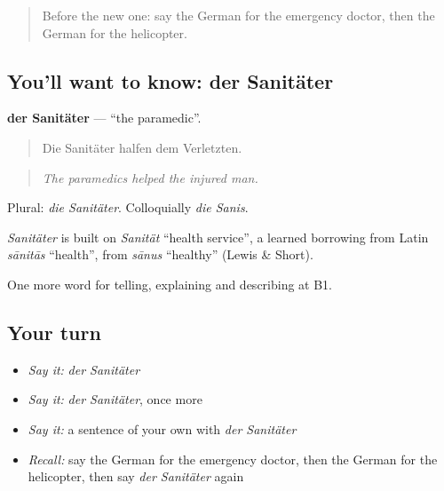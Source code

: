 \label{lesson:GE-C291-sanitaeter}



\begin{quote}
Before the new one: say the German for the emergency doctor, then the German for the helicopter.
\end{quote}

\subsection*{You'll want to know: der Sanitäter}
\textbf{der Sanitäter} — \textquotedblleft{}the paramedic\textquotedblright{}.

\begin{quote}
Die Sanitäter halfen dem Verletzten.
\end{quote}

\begin{quote}
\emph{The paramedics helped the injured man.}
\end{quote}

Plural: \emph{die Sanitäter}. Colloquially \emph{die Sanis}.

\begin{cousinweb}
\emph{Sanitäter} is built on \emph{Sanität} \textquotedblleft{}health service\textquotedblright{}, a learned borrowing from Latin \emph{sānitās} \textquotedblleft{}health\textquotedblright{}, from \emph{sānus} \textquotedblleft{}healthy\textquotedblright{} (Lewis \& Short).
\end{cousinweb}

\begin{grammarlens}[title={What you've built}]
One more word for telling, explaining and describing at B1.
\end{grammarlens}

\subsection*{Your turn}
\begin{itemize}
\raggedright
  \item \emph{Say it:} \emph{der Sanitäter}
  \item \emph{Say it:} \emph{der Sanitäter}, once more
  \item \emph{Say it:} a sentence of your own with \emph{der Sanitäter}
  \item \emph{Recall:} say the German for the emergency doctor, then the German for the helicopter, then say \emph{der Sanitäter} again
\end{itemize}

